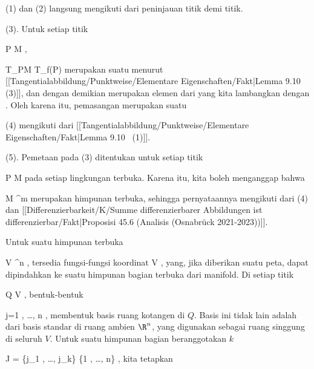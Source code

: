 {

\teilbeweis {}{}{}
{(1) dan (2) langsung mengikuti dari peninjauan titik demi titik.}
{} \teilbeweis {}{}{}
{(3). Untuk setiap titik

\mavergleichskette
{\vergleichskette
{ P
}
{ \in }{ M
}
{  }{
}
{    }{
}
{   }{
}
}
{}{}{},

 { T_PM } { T_{f(P)} \R \cong \R
} {}
merupakan suatu
menurut [[Tangentialabbildung/Punktweise/Elementare Eigenschaften/Fakt|Lemma 9.10  (3)]],
dan dengan demikian merupakan elemen dari
 yang kita lambangkan dengan
. Oleh karena itu, pemasangan
 merupakan suatu
}
{}
\teilbeweis {}{}{}
{(4) mengikuti dari
[[Tangentialabbildung/Punktweise/Elementare Eigenschaften/Fakt|Lemma 9.10  (1)]].}
{}
\teilbeweis {}{}{}
{(5). Pemetaan pada (3) ditentukan untuk setiap titik

\mavergleichskette
{\vergleichskette
{ P
}
{ \in }{ M
}
{  }{
}
{    }{
}
{   }{
}
}
{}{}{}
pada setiap lingkungan terbuka. Karena itu, kita boleh menganggap bahwa

\mavergleichskette
{\vergleichskette
{ M
}
{ \subseteq }{ \R^m
}
{  }{
}
{    }{
}
{   }{
}
}
{}{}{}
merupakan himpunan terbuka, sehingga pernyataannya mengikuti dari (4) dan
[[Differenzierbarkeit/K/Summe differenzierbarer Abbildungen ist differenzierbar/Fakt|Proposisi 45.6 (Analisis (Osnabrück 2021-2023))]].}
{}

}

Untuk suatu himpunan terbuka

\mavergleichskette
{\vergleichskette
{ V
}
{ \subseteq }{ \R^n
}
{  }{
}
{    }{
}
{   }{
}
}
{}{}{},
tersedia fungsi-fungsi koordinat
 {V} {\R
} {},
yang, jika diberikan suatu peta, dapat dipindahkan ke suatu himpunan bagian terbuka dari manifold. Di setiap titik

\mavergleichskette
{\vergleichskette
{ Q
}
{ \in }{ V
}
{  }{
}
{    }{
}
{   }{
}
}
{}{}{},
bentuk-bentuk

 {}
 {j=1 , \ldots , n} {}
 {} {} {} {,}
membentuk basis ruang kotangen di $Q$. Basis ini tidak lain adalah
dari basis standar di ruang ambien $\R^n$, yang digunakan sebagai ruang singgung di seluruh $V$. Untuk suatu himpunan bagian beranggotakan $k$

\mavergleichskettedisp
{\vergleichskette
{ J
}
{ =} { \{j_1 , \ldots , j_k\}
}
{ \subseteq} { \{1 , \ldots , n\}
}
{ } {
}
{ } {
}
}
{}{}{},
kita tetapkan


